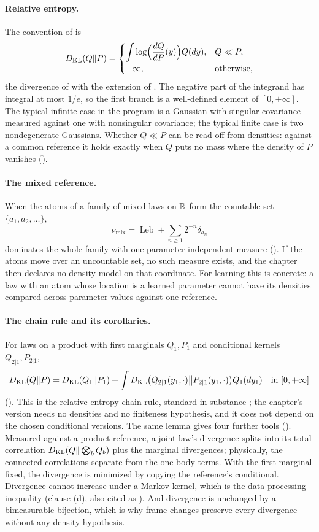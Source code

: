 \paragraph{Relative entropy.}
The convention of  is
\[
D_{\mathrm{KL}}(Q\Vert P)=
\begin{cases}
\displaystyle\int\log\Bigl(\frac{dQ}{dP}(y)\Bigr)Q(dy), & Q\ll P,\\[1.2ex]
+\infty, & \text{otherwise},
\end{cases}
\]
the divergence of \citet{Kullback1951} with the extension of \citet{Csiszar1967}. The negative part of the
integrand has integral at most $1/e$, so the first branch is a well-defined element of $[0,+\infty]$. The
typical infinite case in the program is a Gaussian with singular covariance measured against one with
nonsingular covariance; the typical finite case is two nondegenerate Gaussians. Whether $Q\ll P$ can be read
off from densities: against a common reference it holds exactly when $Q$ puts no mass where the density of $P$
vanishes ().

\paragraph{The mixed reference.}
When the atoms of a family of mixed laws on $\mathbb R$ form the countable set $\{a_1,a_2,\ldots\}$,
\[
\nu_{\mathrm{mix}}=\operatorname{Leb}+\sum_{n\geq1}2^{-n}\delta_{a_n}
\]
dominates the whole family with one parameter-independent measure (). If the
atoms move over an uncountable set, no such measure exists, and the chapter then declares no density model on that
coordinate. For learning this is concrete: a law with an atom whose location is a learned parameter cannot have
its densities compared across parameter values against one reference.

\paragraph{The chain rule and its corollaries.}
For laws on a product with first marginals $Q_1,P_1$ and conditional kernels $Q_{2|1},P_{2|1}$,
\[
D_{\mathrm{KL}}(Q\Vert P)=D_{\mathrm{KL}}(Q_1\Vert P_1)+\int D_{\mathrm{KL}}\bigl(Q_{2|1}(y_1,\cdot)\big\Vert P_{2|1}(y_1,\cdot)\bigr)Q_1(dy_1)
\quad\text{in }[0,+\infty]
\]
(). This is the relative-entropy chain rule, standard in substance
\citep[Section~2.5]{CoverThomas2006}; the chapter's version needs no densities and no finiteness hypothesis, and
it does not depend on the chosen conditional versions. The same lemma gives four further tools
(). Measured against a product reference, a joint law's divergence splits into its
total correlation $D_{\mathrm{KL}}(Q\Vert\bigotimes_bQ_b)$ plus the marginal divergences; physically, the connected
correlations separate from the one-body terms. With the first marginal fixed, the divergence is minimized by
copying the reference's conditional. Divergence cannot increase under a Markov kernel, which is the data
processing inequality (clause (d), also cited as ). And divergence is unchanged by a
bimeasurable bijection, which is why frame changes preserve every divergence without any density hypothesis.

